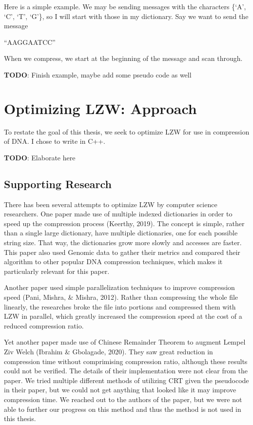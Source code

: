 \documentclass[12pt,twoside]{reedthesis}
\begin{document}
Here is a simple example. We may be sending messages with the characters \{`A', `C', `T', `G'\}, so I will start with those in my dictionary. Say we want to send the message

``AAGGAATCC''

When we compress, we start at the beginning of the message and scan through.

\textbf{TODO}: Finish example, maybe add some pseudo code as well

\hypertarget{optimizing-lzw-approach}{%
\chapter{Optimizing LZW: Approach}\label{optimizing-lzw-approach}}

To restate the goal of this thesis, we seek to optimize LZW for use in compression of DNA. I chose to write in C++.

\textbf{TODO}: Elaborate here

\hypertarget{supporting-research}{%
\section{Supporting Research}\label{supporting-research}}

There has been several attempts to optimize LZW by computer science researchers. One paper made use of multiple indexed dictionaries in order to speed up the compression process (Keerthy, 2019). The concept is simple, rather than a single large dictionary, have multiple dictionaries, one for each possible string size. That way, the dictionaries grow more slowly and accesses are faster. This paper also used Genomic data to gather their metrics and compared their algorithm to other popular DNA compression techniques, which makes it particularly relevant for this paper.

Another paper used simple parallelization techniques to improve compression speed (Pani, Mishra, \& Mishra, 2012). Rather than compressing the whole file linearly, the researches broke the file into portions and compressed them with LZW in parallel, which greatly increased the compression speed at the cost of a reduced compression ratio.

Yet another paper made use of Chinese Remainder Theorem to augment Lempel Ziv Welch (Ibrahim \& Gbolagade, 2020). They saw great reduction in compression time without comprimising compression ratio, although these results could not be verified. The details of their implementation were not clear from the paper. We tried multiple different methods of utilizing CRT given the pseudocode in their paper, but we could not get anything that looked like it may improve compression time. We reached out to the authors of the paper, but we were not able to further our progress on this method and thus the method is not used in this thesis.
\end{document}
